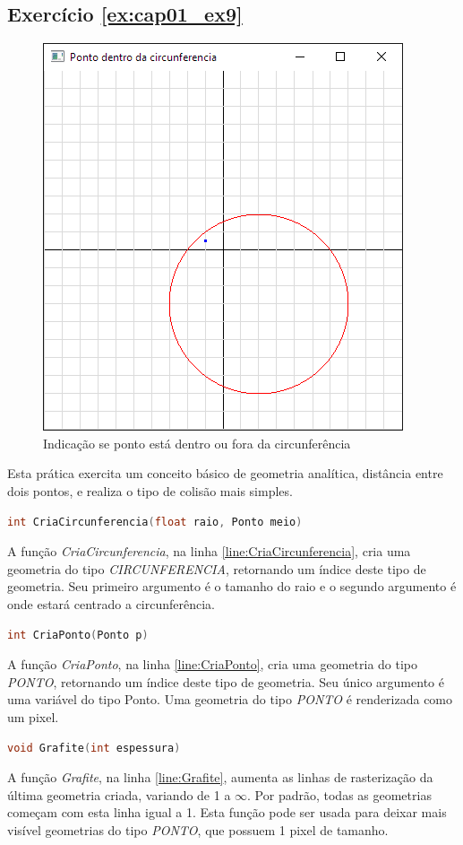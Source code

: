 \subsection*{Exercício \ref{ex:cap01_ex9}}
\begin{figure}[ht]
  \centerline{\includegraphics[width=.5\textwidth]{img/cap1_ex9.png}}
  \caption{Indicação se ponto está dentro ou fora da circunferência}
  \label{fig:cap01_ex4}
\end{figure}
Esta prática exercita um conceito básico de geometria analítica, distância entre dois pontos, e realiza o tipo de colisão mais simples.


\begin{lstlisting}[label={func:CriaCircunferencia},language=C++]
int CriaCircunferencia(float raio, Ponto meio)
\end{lstlisting}
A função \emph{CriaCircunferencia}, na linha \ref{line:CriaCircunferencia}, cria uma geometria do tipo \emph{CIRCUNFERENCIA}, retornando um índice deste tipo de geometria. Seu primeiro argumento é o tamanho do raio e o segundo argumento é onde estará centrado a circunferência.

\begin{lstlisting}[label={func:CriaPonto},language=C++]
int CriaPonto(Ponto p)
\end{lstlisting}
A função \emph{CriaPonto}, na linha \ref{line:CriaPonto}, cria uma geometria do tipo \emph{PONTO}, retornando um índice deste tipo de geometria. Seu único argumento é uma variável do tipo Ponto. Uma geometria do tipo \emph{PONTO} é renderizada como um pixel.

\begin{lstlisting}[label={func:Grafite},language=C++]
void Grafite(int espessura)
\end{lstlisting}
A função \emph{Grafite}, na linha \ref{line:Grafite}, aumenta as linhas de rasterização da última geometria criada, variando de 1 a $\infty$. Por padrão, todas as geometrias começam com esta linha igual a 1. Esta função pode ser usada para deixar mais visível geometrias do tipo \emph{PONTO}, que possuem 1 pixel de tamanho.

